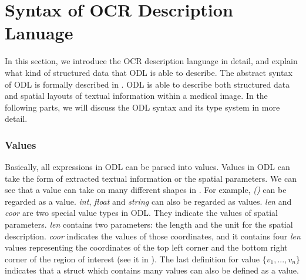 \section{Syntax of OCR Description Lanuage}
\label{sec:syntax}

%
In this section, we introduce the OCR description language in detail,
and explain what kind of structured data that ODL is able to describe.
The abstract syntax of ODL is formally described in .
ODL is able to describe both structured data and
spatial layouts of textual information within a medical image.
In the following parts, we will discuss the ODL syntax and its type system in more detail.


\subsubsection{Values}


Basically, all expressions in ODL can be parsed into values.
Values in ODL can take the form of extracted textual information or the spatial parameters.
	We can see that a value can take on many different shapes
in . For example, \textit{()} can be regarded as a value.
\textit{int},
\textit{float} and \textit{string} can also be regarded as values.
\textit{len} and \textit{coor} are two special value types in ODL.
They indicate the values of spatial parameters.
\textit{len} contains two parameters: the length and the unit for the spatial description.
\textit{coor} indicates the values of those coordinates, and it contains four \textit{len} values representing
the coordinates of the top left corner and the bottom right corner of
the region of interest (see it in ).
The last definition for value  \textit{$\{v_1, ..., v_n\}$} indicates that a struct which contains many values can also be defined as a value.

